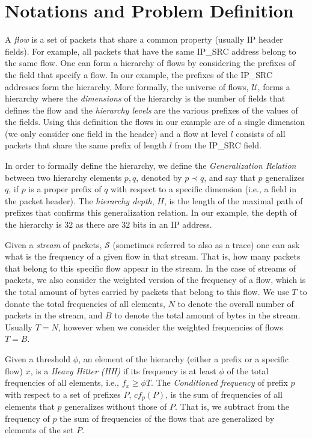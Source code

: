 \section{Notations and Problem Definition}

A \textit{flow} is a set of packets that share a common property (usually IP header fields). For example, all packets that have the same IP\_SRC address belong to the same flow. One can form a hierarchy of flows by considering the prefixes of the field that specify a flow. In our example, the prefixes of the IP\_SRC addresses form the hierarchy. More formally, the universe of flows, $\mathcal U$, forms a hierarchy where the \textit{dimensions} of the hierarchy is the number of fields that defines the flow and the \textit{hierarchy levels} are the various prefixes of the values of the fields. Using this definition the flows in our example are of a single dimension (we only consider one field in the header) and a flow at level $l$ consists of all packets that share the same prefix of length $l$ from the IP\_SRC field.

In order to formally define the hierarchy, we define the \textit{Generalization Relation} between two hierarchy elements $p,q$, denoted by $p \prec q$, and say that $p$ generalizes $q$, if $p$ is a proper prefix of $q$ with respect to a specific dimension (i.e., a field in the packet header). The \textit{hierarchy depth}, $H$, is the length of the maximal path of prefixes that confirms this generalization relation. In our example, the depth of the hierarchy is $32$ as there are $32$ bits in an IP address. 

Given a \textit{stream} of packets, $\mathcal S$ (sometimes referred to also as a trace) one can ask what is the frequency of a given flow in that stream. That is, how many packets that belong to this specific flow appear in the stream. In the case of streams of packets, we also consider the weighted version of the frequency of a flow, which is the total amount of bytes carried by packets that belong to this flow. We use $T$ to donate the total frequencies of all elements, $N$ to denote the overall number of packets in the stream, and $B$ to denote the total amount of bytes in the stream. Usually $T=N$, however when we consider the weighted frequencies of flows $T=B$.

Given a threshold $\phi$, an element of the hierarchy (either a prefix or a specific flow) $x$, is a \textit{Heavy Hitter (HH)} if its frequency is at least $\phi$ of the total frequencies of all elements, i.e., $f_x \geq \phi T$. The \textit{Conditioned frequency} of prefix $p$ with respect to a set of prefixes $P$, $cf_p(P)$, is the sum of frequencies of all elements that $p$ generalizes without those of $P$. That is, we subtract from the frequency of $p$ the sum of frequencies of the flows that are generalized by elements of the set $P$.


